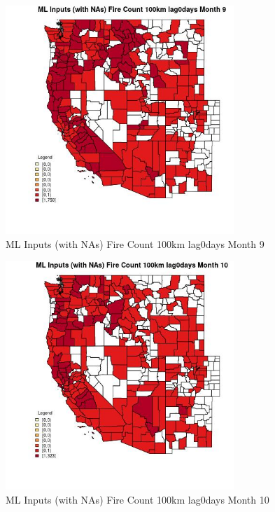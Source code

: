 \begin{figure} 
\centering  
\includegraphics[width=0.77\textwidth]{Code_Outputs/Report_ML_input_PM25_Step4_part_e_de_duplicated_aves_compiled_2019-05-20wNAs_CountyFire_Count_100km_lag0daysmedianMonth9.jpg} 
\caption{\label{fig:Report_ML_input_PM25_Step4_part_e_de_duplicated_aves_compiled_2019-05-20wNAsCountyFire_Count_100km_lag0daysmedianMonth9}ML Inputs (with NAs) Fire Count 100km lag0days Month 9} 
\end{figure} 
 

\begin{figure} 
\centering  
\includegraphics[width=0.77\textwidth]{Code_Outputs/Report_ML_input_PM25_Step4_part_e_de_duplicated_aves_compiled_2019-05-20wNAs_CountyFire_Count_100km_lag0daysmedianMonth10.jpg} 
\caption{\label{fig:Report_ML_input_PM25_Step4_part_e_de_duplicated_aves_compiled_2019-05-20wNAsCountyFire_Count_100km_lag0daysmedianMonth10}ML Inputs (with NAs) Fire Count 100km lag0days Month 10} 
\end{figure} 
 

